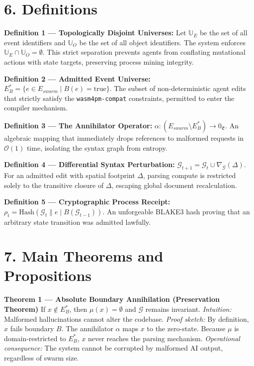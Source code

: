 \section{6. Definitions}

\textbf{Definition 1 — Topologically Disjoint Universes:} Let $\mathbb{U}_E$ be the set of all event identifiers and $\mathbb{U}_O$ be the set of all object identifiers. The system enforces $\mathbb{U}_E \cap \mathbb{U}_O = \emptyset$. This strict separation prevents agents from conflating mutational actions with state targets, preserving process mining integrity.

\textbf{Definition 2 — Admitted Event Universe:} $E_B^* = \{ e \in E_{swarm} \mid B(e) = \text{true} \}$. The subset of non-deterministic agent edits that strictly satisfy the \texttt{wasm4pm-compat} constraints, permitted to enter the compiler mechanism.

\textbf{Definition 3 — The Annihilator Operator:} $\alpha : (E_{swarm} \setminus E_B^*) \to 0_{\mathfrak{E}}$. An algebraic mapping that immediately drops references to malformed requests in $\mathcal{O}(1)$ time, isolating the syntax graph from entropy.

\textbf{Definition 4 — Differential Syntax Perturbation:} $\mathcal{G}_{t+1} = \mathcal{G}_t \cup \nabla_{\mathcal{G}}(\Delta)$. For an admitted edit with spatial footprint $\Delta$, parsing compute is restricted solely to the transitive closure of $\Delta$, escaping global document recalculation.

\textbf{Definition 5 — Cryptographic Process Receipt:} $\rho_t = \text{Hash}(\mathcal{G}_t \parallel e \mid B(\mathcal{G}_{t-1}))$. An unforgeable BLAKE3 hash proving that an arbitrary state transition was admitted lawfully.

\section{7. Main Theorems and Propositions}

\textbf{Theorem 1 — Absolute Boundary Annihilation (Preservation Theorem)}
If $x \notin E_B^*$, then $\mu(x) = \emptyset$ and $\mathcal{G}$ remains invariant.
\textit{Intuition:} Malformed hallucinations cannot alter the codebase.
\textit{Proof sketch:} By definition, $x$ fails boundary $B$. The annihilator $\alpha$ maps $x$ to the zero-state. Because $\mu$ is domain-restricted to $E_B^*$, $x$ never reaches the parsing mechanism.
\textit{Operational consequence:} The system cannot be corrupted by malformed AI output, regardless of swarm size.

